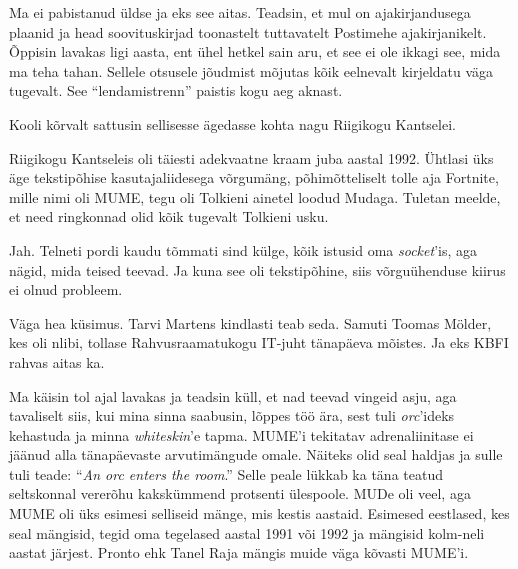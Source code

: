 Ma ei pabistanud üldse ja eks see aitas. Teadsin, et mul on
ajakirjandusega plaanid ja head soovituskirjad 
toonastelt tuttavatelt Postimehe ajakirjanikelt. Õppisin 
lavakas ligi aasta, ent ühel hetkel sain aru, et see ei ole ikkagi see, mida ma teha tahan. 
Sellele otsusele jõudmist mõjutas kõik eelnevalt kirjeldatu 
väga tugevalt. See \enquote{lendamistrenn} paistis kogu aeg aknast. 

Kooli kõrvalt sattusin sellisesse ägedasse kohta nagu Riigikogu 
Kantselei.


Riigikogu Kantseleis oli täiesti adekvaatne kraam juba aastal 1992. 
Ühtlasi üks äge tekstipõhise kasutajaliidesega võrgumäng, 
põhimõtteliselt tolle aja Fortnite, mille nimi oli 
MUME, tegu oli Tolkieni ainetel loodud 
Mudaga. Tuletan meelde, et need ringkonnad olid kõik 
tugevalt Tolkieni usku.


Jah. Telneti pordi kaudu tõmmati sind külge, kõik istusid oma 
\emph{socket}'is, aga nägid, mida teised teevad. Ja kuna see oli 
tekstipõhine, siis võrguühenduse kiirus ei olnud probleem.


Väga hea küsimus. Tarvi 
Martens kindlasti teab seda. Samuti
Toomas Mölder, kes oli nlibi, 
tollase Rahvusraamatukogu IT-juht tänapäeva mõistes. Ja eks KBFI rahvas aitas ka.


Ma käisin tol ajal lavakas ja teadsin küll, et nad teevad 
vingeid asju, aga tavaliselt siis, kui mina sinna saabusin, 
lõppes töö ära, sest tuli \emph{orc}'ideks kehastuda ja minna 
\emph{whiteskin}'e tapma. MUME'i tekitatav adrenaliinitase ei jäänud alla 
tänapäevaste arvutimängude omale. Näiteks olid seal haldjas ja sulle tuli 
teade: \enquote{\emph{An orc enters the room}.} Selle peale lükkab ka täna teatud 
seltskonnal vererõhu kakskümmend protsenti ülespoole. MUDe oli veel, aga 
MUME oli üks esimesi selliseid mänge, mis kestis aastaid. Esimesed 
eestlased, kes seal mängisid, tegid oma tegelased aastal 1991 või 1992 ja mängisid kolm-neli aastat järjest. Pronto ehk Tanel Raja mängis muide väga kõvasti MUME'i. 


